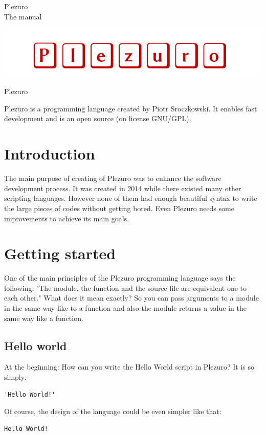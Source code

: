 \documentclass{article}
\begin{document}
\center
\huge
Plezuro\\
The manual

\includegraphics[scale=0.5]{../logo.png}

\pagebreak
\flushleft
\normalsize

Plezuro

Plezuro is a programming language created by Piotr Sroczkowski. It enables fast development and is an open source (on license GNU/GPL).

\section{Introduction}
The main purpose of creating of Plezuro was to enhance the software development process. It was created in 2014 while there existed many other scripting languages. However none of them had enough beautiful syntax to write the large pieces of codes without getting bored. Even Plezuro needs some improvements to achieve its main goals.

\section{Getting started}
One of the main principles of the Plezuro programming language says the following: "The module, the function and the source file are equivalent one to each other." What does it mean exactly? So you can pass arguments to a module in the same way like to a function and also the module returns a value in the same way like a function.

\subsection{Hello world}
At the beginning: How can you write the Hello World script in Plezuro? It is so simply:

\begin{lstlisting}
'Hello World!'
\end{lstlisting}

Of course, the design of the language could be even simpler like that:

\begin{lstlisting}
Hello World!
\end{lstlisting}
\end{document}
